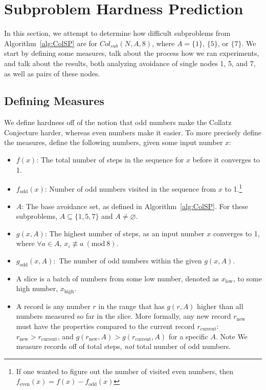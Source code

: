 \documentclass[12pt]{article}
\newcommand{\Mod}[1]{\ (\mathrm{mod}\ #1)}
\theoremstyle{definition}
\begin{document}
\section{Subproblem Hardness Prediction} \label{sec:subhrdnspred}
In this section, we attempt to determine how difficult subproblems from Algorithm~\ref{alg:ColSP} are for $Col_{sub}(N,A,8)$, where $A= \{1\}$, $\{5\}$, or $\{7\}$. We start by defining some measures, talk about the process how we ran experiments, and talk about the results, both analyzing avoidance of single nodes 1, 5, and 7, as well as pairs of these nodes.
\subsection{Defining Measures} \label{subsec:algdefinemeasure} 
We define hardness off of the notion that odd numbers make the Collatz Conjecture harder, whereas even numbers make it easier. To more precisely define the measures, define the following numbers, given some input number $x$:
\begin{itemize}
    \item $f(x)$: The total number of steps in the sequence for $x$ before it converges to 1.
    \item $f_\text{odd}(x)$: Number of odd numbers visited in the sequence from $x$ to 1.\footnote{If one wanted to figure out the number of visited even numbers, then $f_\text{even}(x) = f(x) - f_\text{odd}(x)$} 
    \item $A$: The base avoidance set, as defined in Algorithm~\ref{alg:ColSP}. For these subproblems, $A \subseteq \{1, 5, 7\}$ and $A \ne \varnothing$.
    \item $g(x,A)$: The highest number of steps, as an input number $x$ converges to 1, where $\forall a \in A$, $x_i \not\equiv a \Mod{8}$.
    \item $g_\text{odd}(x,A):$ The number of odd numbers within the given $g(x,A)$.
    \item A slice is a batch of numbers from some low number, denoted as $x_\text{low}$, to some high number, $x_\text{high}$.
    \item A record is any number $r$ in the range that has $g(r,A)$ higher than all numbers measured so far in the slice. More formally, any new record $r_\text{new}$ must have the properties compared to the current record $r_\text{current}$: $r_\text{new} > r_\text{current}$, and $g(r_\text{new},A) > g(r_\text{current},A)$ for a specific $A$. Note We measure records off of total steps, \textit{not} total number of odd numbers.
\end{itemize}
\end{document}
